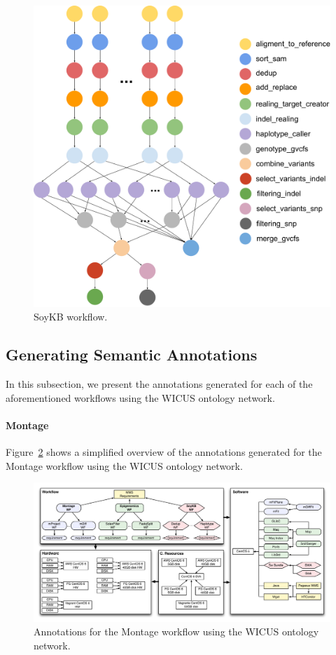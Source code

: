 \begin{figure}[!htb]
	\centering
	\includegraphics[width=0.95\linewidth]{figures/workflow-soybean}
	\caption{SoyKB workflow.}
	\label{fig:workflow-soykb}
\end{figure}



\subsection{Generating Semantic Annotations}

In this subsection, we present the annotations generated for each of the aforementioned
workflows using the WICUS ontology network.


\paragraph{\textbf{Montage}}
Figure~\ref{fig:annotations} shows a simplified overview of the annotations generated 
for the Montage workflow using the WICUS ontology network.

\begin{figure}[!htb]
	\centering
	\includegraphics[width=\linewidth]{figures/annotations}
	\caption{Annotations for the Montage workflow using the WICUS ontology network.}
	\label{fig:annotations}
\end{figure}

